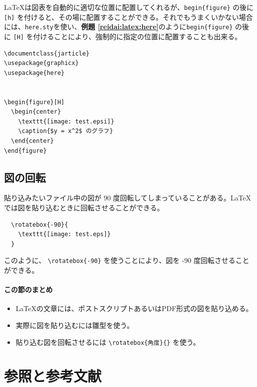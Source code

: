 \LaTeX は図表を自動的に適切な位置に配置してくれるが、\verb|begin{figure}| の後に \texttt{[h]} を付けると、その場に配置することができる。それでもうまくいかない場合には、\texttt{here.sty}を使い、\textbf{例題 \ref{reidai:latex:here}}のように\verb|begin{figure}| の後に \texttt{[H]} を付けることにより、強制的に指定の位置に配置することも出来る。
\begin{reidai}
\label{reidai:latex:here}
\begin{verbatim}
\documentclass{jarticle}
\usepackage{graphicx}
\usepackage{here}


\begin{figure}[H]
  \begin{center}
    \texttt{[image: test.epsi]}
    \caption{$y = x^2$ のグラフ}
  \end{center}
\end{figure}

\end{verbatim}
\end{reidai}

\subsection{図の回転}
\label{sec:latex:rotate_eps}

貼り込みたいファイル中の図が 90 度回転してしまっていることがある。\LaTeX では図を貼り込むときに回転させることができる。
\begin{reidai}
\begin{verbatim}
  \rotatebox{-90}{
    \texttt{[image: test.eps]}
  }
\end{verbatim}
\end{reidai} \noindent
このように、 \verb|\rotatebox{-90}| を使うことにより、図を -90 度回転させることができる。


\paragraph{この節のまとめ}

\begin{itemize}
\item \LaTeX の文章には、ポストスクリプトあるいはPDF形式の図を貼り込める。
\item 実際に図を貼り込むには雛型を使う。
\item 貼り込む図を回転させるには \verb|\rotatebox{角度}{}| を使う。
\end{itemize}

\section{参照と参考文献}
\label{sec:latex:ref_and_bib}

